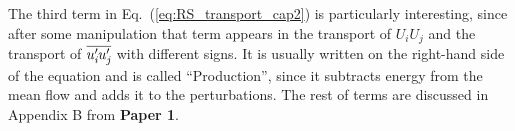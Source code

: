 The third term in Eq.~(\ref{eq:RS_transport_cap2}) is particularly interesting, since after some manipulation that term appears in the transport of $U_iU_j$ and the transport of $\overline{u_i^{\prime}\mkern-1.2mu u_j^{\prime}\mkern-1.2mu}$ with different signs. It is usually written on the right-hand side of the equation and is called ``Production'', since it subtracts energy from the mean flow and adds it to the perturbations.
The rest of terms are discussed in Appendix B from \textbf{Paper 1}.

